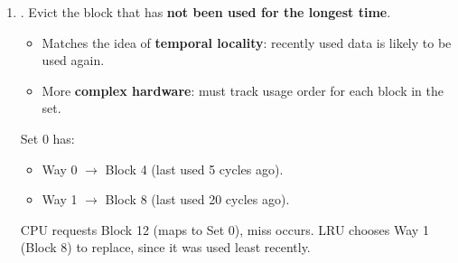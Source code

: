 \begin{enumerate}
    \item {}. Evict the block that has \textbf{not been used for the longest time}.
    \begin{itemize}
        \item[\textcolor{Green3}{\faIcon{check}}] Matches the idea of \textbf{temporal locality}: recently used data is likely to be used again.
        \item[\textcolor{Red2}{\faIcon{times}}] More \textbf{complex hardware}: must track usage order for each block in the set.
    \end{itemize}
    \begin{examplebox}
        Set 0 has:
        \begin{itemize}
            \item Way 0 $\rightarrow$ Block 4 (last used 5 cycles ago).
            \item Way 1 $\rightarrow$ Block 8 (last used 20 cycles ago).
        \end{itemize}
        CPU requests Block 12 (maps to Set 0), miss occurs. LRU chooses Way 1 (Block 8) to replace, since it was used least recently.
    \end{examplebox}
\end{enumerate}